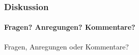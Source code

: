 \begin{frame}\thispagestyle{empty}
	\frametitle{Diskussion \hfill{} \footnotesize \group}
	\framesubtitle{Fragen? Anregungen? Kommentare?}
	\begin{center}
		\Large
		Fragen, Anregungen oder Kommentare?\\~\\
	\end{center}
\end{frame}
